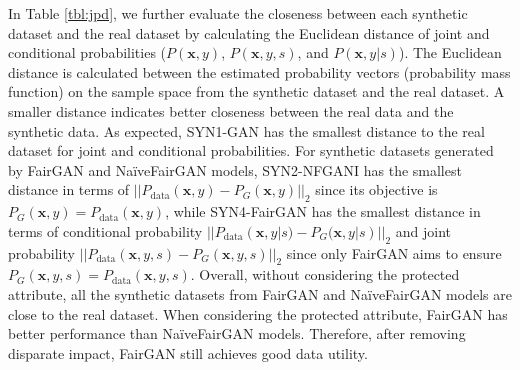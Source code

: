\documentclass[sigconf]{acmart}
\theoremstyle{definition}
\begin{document}
In Table \ref{tbl:jpd}, we further evaluate the closeness between each synthetic dataset and the real dataset by calculating the Euclidean distance of joint and conditional probabilities ($P(\mathbf{x},y)$, $P(\mathbf{x},y,s)$, and $P(\mathbf{x},y|s)$). 
The Euclidean distance is calculated between the estimated probability vectors (probability mass function) on the sample space from the synthetic dataset and the real dataset. A smaller distance indicates better closeness between the real data and the synthetic data. As expected, SYN1-GAN has the smallest distance to the real dataset for joint and conditional probabilities. For synthetic datasets generated by FairGAN and Na\"iveFairGAN models, SYN2-NFGANI has the smallest distance in terms of $||P_{\text{data}}(\mathbf{x},y)-P_G(\mathbf{x},y)||_2$ since its objective is $P_G (\mathbf{x},y)=P_{\text{data}}(\mathbf{x},y)$, while SYN4-FairGAN has the smallest distance in terms of conditional probability $||P_{\text{data}}(\mathbf{x},y|s)-P_G(\mathbf{x},y|s)||_2$ and joint probability $||P_{\text{data}}(\mathbf{x},y,s)-P_G(\mathbf{x},y,s)||_2$ since only FairGAN aims to ensure $P_G (\mathbf{x},y,s)=P_{\text{data}}(\mathbf{x},y,s)$. Overall, without considering the protected attribute, all the synthetic datasets from FairGAN and Na\"iveFairGAN models are close to the real dataset. When considering the protected attribute, FairGAN has better performance than Na\"iveFairGAN models. Therefore, after  removing disparate impact, FairGAN  still achieves good data utility. 
\end{document}
